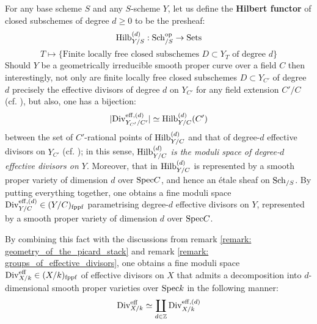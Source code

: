          \begin{remark} \label{remark: moduli_of_effective_divisors}
            For any base scheme $S$ and any $S$-scheme $Y$, let us define the \textbf{Hilbert functor} of closed subschemes of degree $d \geq 0$ to be the presheaf:
                $$\mathrm{Hilb}_{Y/S}^{(d)}: \mathrm{Sch}_{/S}^{\mathrm{op}} \to \mathrm{Sets}$$
                $$T \mapsto \{\text{Finite locally free closed subschemes $D \subset Y_T$ of degree $d$}\}$$
            Should $Y$ be a geometrically irreducible smooth proper curve over a field $C$ then interestingly, not only are finite locally free closed subschemes $D \subset Y_{C'}$ of degree $d$ precisely the effective divisors of degree $d$ on $Y_{C'}$ for any field extension $C'/C$ (cf. \cite[\href{https://stacks.math.columbia.edu/tag/0B9D}{Tag 0B9D}]{stacks}), but also, one has a bijection:
                $$|\mathrm{Div}_{Y_{C'}/C'}^{\mathrm{eff}, (d)}| \simeq \mathrm{Hilb}_{Y/C}^{(d)}(C')$$
            between the set of $C'$-rational points of $\mathrm{Hilb}_{Y/C}^{(d)}$ and that of degree-$d$ effective divisors on $Y_{C'}$ (cf. \cite[\href{https://stacks.math.columbia.edu/tag/0B9I}{Tag 0B9I}]{stacks}); in this sense, \textit{$\mathrm{Hilb}_{Y/C}^{(d)}$ is the moduli space of degree-$d$ effective divisors on $Y$}. Moreover, \cite[\href{https://stacks.math.columbia.edu/tag/0B9H}{Tag 0B9H} and \href{https://stacks.math.columbia.edu/tag/0B9I}{Tag 0B9I}]{stacks} that in $\mathrm{Hilb}_{Y/C}^{(d)}$ is represented by a smooth proper variety of dimension $d$ over $\mathrm{Spec} C$, and hence an \'etale sheaf on $\mathrm{Sch}_{/S}$. By putting everything together, one obtains a fine moduli space $\mathrm{Div}_{Y/C}^{\mathrm{eff}, (d)} \in (Y/C)_{\mathrm{fppf}}$ parametrising degree-$d$ effective divisors on $Y$, represented by a smooth proper variety of dimension $d$ over $\mathrm{Spec} C$.
            
            By combining this fact with the discussions from remark \ref{remark: geometry_of_the_picard_stack} and remark \ref{remark: groups_of_effective_divisors}, one obtains a fine moduli space $\mathrm{Div}_{X/k}^{\mathrm{eff}} \in (X/k)_{\mathrm{fppf}}$ of effective divisors on $X$ that admits a decomposition into $d$-dimensional smooth proper varieties over $\mathrm{Spec} k$ in the following manner:
                $$\mathrm{Div}_{X/k}^{\mathrm{eff}} \simeq \coprod_{d \in \mathbb{Z}} \mathrm{Div}_{X/k}^{\mathrm{eff}, (d)}$$
        \end{remark}
        
